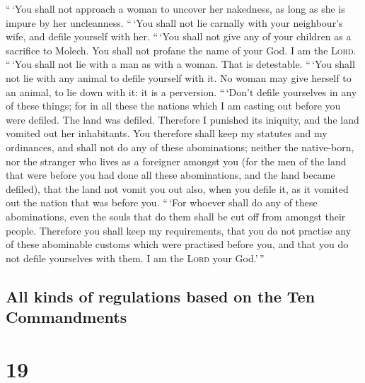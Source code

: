  ``\,`You shall not approach a woman to uncover her
nakedness, as long as she is impure by her uncleanness. 
``\,`You shall not lie carnally with your neighbour's wife, and defile
yourself with her.  ``\,`You shall not give any of your
children as a sacrifice to Molech. You shall not profane the name of
your God. I am the \textsc{Lord}.  ``\,`You shall not lie
with a man as with a woman. That is detestable.  ``\,`You
shall not lie with any animal to defile yourself with it. No woman may
give herself to an animal, to lie down with it: it is a perversion.
 ``\,`Don't defile yourselves in any of these things; for
in all these the nations which I am casting out before you were defiled.
 The land was defiled. Therefore I punished its iniquity,
and the land vomited out her inhabitants.  You therefore
shall keep my statutes and my ordinances, and shall not do any of these
abominations; neither the native-born, nor the stranger who lives as a
foreigner amongst you  (for the men of the land that were
before you had done all these abominations, and the land became
defiled),  that the land not vomit you out also, when you
defile it, as it vomited out the nation that was before you.
 ``\,`For whoever shall do any of these abominations,
even the souls that do them shall be cut off from amongst their people.
 Therefore you shall keep my requirements, that you do
not practise any of these abominable customs which were practised before
you, and that you do not defile yourselves with them. I am the
\textsc{Lord} your God.'\,''

\hypertarget{all-kinds-of-regulations-based-on-the-ten-commandments}{%
\subsection{All kinds of regulations based on the Ten
Commandments}\label{all-kinds-of-regulations-based-on-the-ten-commandments}}

\hypertarget{section-18}{%
\section{19}\label{section-18}}


